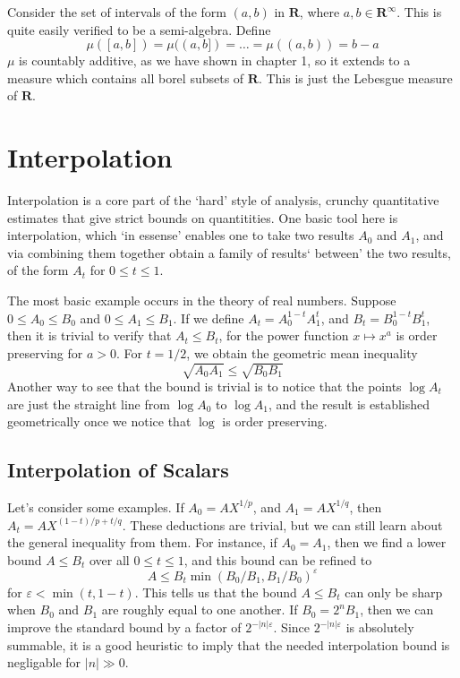\begin{example}
    Consider the set of intervals of the form $(a,b)$ in $\mathbf{R}$, where $a,b \in \mathbf{R}^\infty$. This is quite easily verified to be a semi-algebra. Define
    \[ \mu([a,b]) = \mu((a,b]) = \dots = \mu((a,b)) = b - a \]
    $\mu$ is countably additive, as we have shown in chapter 1, so it extends to a measure which contains all borel subsets of $\mathbf{R}$. This is just the Lebesgue measure of $\mathbf{R}$.
\end{example}

\chapter{Interpolation}

Interpolation is a core part of the `hard' style of analysis, crunchy quantitative estimates that give strict bounds on quantitities. One basic tool here is interpolation, which `in essense' enables one to take two results $A_0$ and $A_1$, and via combining them together obtain a family of results` between' the two results, of the form $A_t$ for $0 \leq t \leq 1$.

The most basic example occurs in the theory of real numbers. Suppose $0 \leq A_0 \leq B_0$ and $0 \leq A_1 \leq B_1$. If we define $A_t = A_0^{1-t}A_1^t$, and $B_t = B_0^{1-t}B_1^t$, then it is trivial to verify that $A_t \leq B_t$, for the power function $x \mapsto x^a$ is order preserving for $a > 0$. For $t = 1/2$, we obtain the geometric mean inequality
%
\[ \sqrt{A_0 A_1} \leq \sqrt{B_0 B_1} \]
%
Another way to see that the bound is trivial is to notice that the points $\log A_t$ are just the straight line from $\log A_0$ to $\log A_1$, and the result is established geometrically once we notice that $\log$ is order preserving.

\section{Interpolation of Scalars}

Let's consider some examples. If $A_0 = AX^{1/p}$, and $A_1 = AX^{1/q}$, then $A_t = AX^{(1-t)/p + t/q}$. These deductions are trivial, but we can still learn about the general inequality from them. For instance, if $A_0 = A_1$, then we find a lower bound $A \leq B_t$ over all $0 \leq t \leq 1$, and this bound can be refined to
%
\[ A \leq B_t \min(B_0/B_1,B_1/B_0)^\varepsilon \]
%
for $\varepsilon < \min(t, 1-t)$. This tells us that the bound $A \leq B_t$ can only be sharp when $B_0$ and $B_1$ are roughly equal to one another. If $B_0 = 2^n B_1$, then we can improve the standard bound by a factor of $2^{-|n| \varepsilon}$. Since $2^{-|n| \varepsilon}$ is absolutely summable, it is a good heuristic to imply that the needed interpolation bound is negligable for $|n| \gg 0$.

